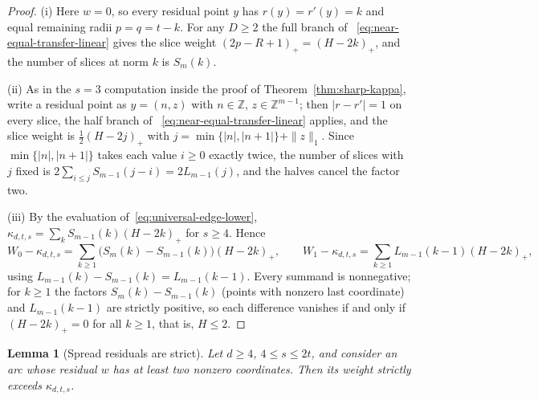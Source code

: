 \documentclass[pdflatex,sn-mathphys-num]{sn-jnl}
\theoremstyle{thmstyleone}
\newtheorem{lemma}[theorem]{Lemma}
\theoremstyle{thmstylethree}
\theoremstyle{thmstyletwo}
\newcommand{\Z}{\mathbb Z}
\begin{document}
\begin{proof}
(i) Here $w=0$, so every residual point $y$ has $r(y)=r'(y)=k$ and equal
remaining radii $p=q=t-k$.  For any $D\ge2$ the full branch of
~\eqref{eq:near-equal-transfer-linear} gives the slice weight
$(2p-R+1)_+=(H-2k)_+$, and the number of slices at norm $k$ is $S_m(k)$.

(ii) As in the $s=3$ computation inside the proof of
Theorem~\ref{thm:sharp-kappa}, write a residual point as $y=(n,z)$ with
$n\in\Z$, $z\in\Z^{m-1}$; then $|r-r'|=1$ on every slice, the half branch of
~\eqref{eq:near-equal-transfer-linear} applies, and the slice weight is
$\tfrac12(H-2j)_+$ with $j=\min\{|n|,|n+1|\}+\|z\|_1$.  Since
$\min\{|n|,|n+1|\}$ takes each value $i\ge0$ exactly twice, the number of
slices with $j$ fixed is $2\sum_{i\le j}S_{m-1}(j-i)=2L_{m-1}(j)$, and the
halves cancel the factor two.

(iii) By the evaluation of~\eqref{eq:universal-edge-lower},
$\kappa_{d,t,s}=\sum_kS_{m-1}(k)(H-2k)_+$ for $s\ge4$.  Hence
\[
 W_0-\kappa_{d,t,s}=\sum_{k\ge1}\bigl(S_m(k)-S_{m-1}(k)\bigr)(H-2k)_+,
 \qquad
 W_1-\kappa_{d,t,s}=\sum_{k\ge1}L_{m-1}(k-1)(H-2k)_+,
\]
using $L_{m-1}(k)-S_{m-1}(k)=L_{m-1}(k-1)$.  Every summand is nonnegative;
for $k\ge1$ the factors $S_m(k)-S_{m-1}(k)$ (points with nonzero last
coordinate) and $L_{m-1}(k-1)$ are strictly positive, so each difference
vanishes if and only if $(H-2k)_+=0$ for all $k\ge1$, that is, $H\le2$.
\end{proof}

\begin{lemma}[Spread residuals are strict]
\label{lem:spread-strict}
Let $d\ge4$, $4\le s\le2t$, and consider an arc whose residual $w$ has at
least two nonzero coordinates.  Then its weight strictly exceeds
$\kappa_{d,t,s}$.
\end{lemma}
\end{document}
